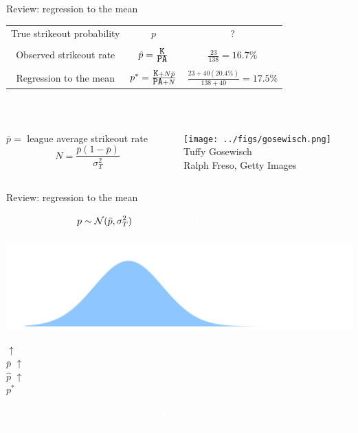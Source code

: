 \documentclass{beamer}
\def\l{\left}\def\r{\right}\def\lf{\lfloor}\def\rf{\rfloor}
\begin{document}
\begin{frame}{Review: regression to the mean}
\begin{tabular}{ccc}
True strikeout probability  & $p$ & ?\\
    \vspace{2mm}\\
Observed strikeout rate     & $\hat p = \frac{\mbox{\tt K}}{\mbox{\tt PA}}$
    & $\frac{23}{138} = 16.7\%$\\
    \vspace{2mm}\\
Regression to the mean      & $p^* = \frac{\mbox{\tt K} + N\bar p}
    {\mbox{\tt PA} + N}$ & $\frac{23 + 40(20.4\%)}{138 + 40} = 17.5\%$
\end{tabular}\\
\vspace{4mm}
\begin{columns}
\begin{column}{0.6\textwidth}
\hfill {\small $\bar p =$ league average strikeout rate}\\
\vspace{1cm}
$$N = \frac{\bar p(1 - \bar p)}{\sigma^2_T}$$
\end{column}
\begin{column}{0.4\textwidth}
\centering
\texttt{[image: ../figs/gosewisch.png]}\\
\large Tuffy Gosewisch\\
{\color{gray}\tiny Ralph Freso, Getty Images}
\end{column}
\end{columns}
\end{frame}

\begin{frame}{Review: regression to the mean}
$$p \sim \N(\bar p, \sigma^2_T) \hspace{1cm}
{\color{white} \hat p|p \sim \N\l(p,~\sigma^2_L = \frac{p(1-p)}{n}\r)}$$
\begin{center}
\includegraphics[width = \textwidth]{../figs/talent.pdf}\\
\end{center}
\vspace{-6mm}\tabto*{37mm}$\uparrow$\\
\tabto*{37mm}$\bar p$
{\color{white}
\vspace{-5mm}\tabto*{58mm}$\uparrow$\\
\tabto*{57.5mm}$\hat p$
\vspace{-4.5mm}\tabto*{44mm}$\uparrow$\\
\tabto*{44mm}$p^*$\\}
$${\color{white} p^* = E[p|\hat p] = \arg\min_{p^*}{E[(p - p^*)^2|\hat p]}
    = \frac{\sigma_T^{-2}\bar p + \sigma_L^{-2}\hat p}
    {\sigma_T^{-2} + \sigma_L^{-2}}}$$
\end{frame}
\end{document}
